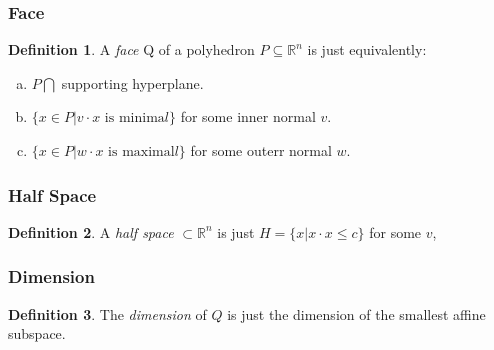 \documentclass[]{article}
\theoremstyle{definition}
\newtheorem*{defn}{Definition}
\begin{document}
			\subsubsection{Face}
			\begin{defn}
			A \emph{face} Q of a polyhedron $P \subseteq \mathbb{R}^n$ is just equivalently:
			\begin{enumerate}[(a)]
			\item $P \bigcap $ supporting hyperplane.
			\item $\{x \in P | v\cdot x \text{ is minima}l\}$ for some inner normal $v$. 
			\item $\{x \in P | w\cdot x \text{ is maximal}l\}$ for some outerr normal $w$.
			\end{enumerate}
			\end{defn}
			\subsubsection{Half Space}
			\begin{defn}
			A \emph{half space} $\subset\mathbb{R}^n$ is just
			$H=\{x | x\cdot x \leq c\}$
			for some $v$,
			\end{defn}
			\subsubsection{Dimension}
			\begin{defn}
			The \emph{dimension} of $Q$ is just the dimension of the smallest affine subspace.
			\end{defn}

			

%
%
%
%
%
%
%
%
%
%
%
%
%
%
%			
\end{document}
